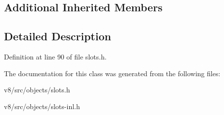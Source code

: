 \subsection*{Additional Inherited Members}


\subsection{Detailed Description}


Definition at line 90 of file slots.\+h.



The documentation for this class was generated from the following files\+:\begin{DoxyCompactItemize}
\item 
v8/src/objects/slots.\+h\item 
v8/src/objects/slots-\/inl.\+h\end{DoxyCompactItemize}
